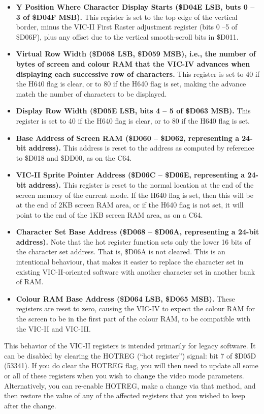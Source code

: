\begin{itemize}
\item {\bf Y Position Where Character Display Starts (\$D04E LSB, buts 0 -- 3 of \$D04F MSB).}  This register is set to the top edge of the vertical border, minus the VIC-II First Raster adjustment register (bits 0 --5 of \$D06F), plus any offset due to the vertical smooth-scroll bits in \$D011.
\item {\bf Virtual Row Width (\$D058 LSB, \$D059 MSB), i.e., the number of bytes of screen and colour RAM that the VIC-IV advances when displaying each successive row of characters.} This register is set to 40 if the H640 flag is clear, or to 80 if the H640 flag is set, making the advance match the number of characters to be displayed.
\item {\bf Display Row Width (\$D05E LSB, bits 4 -- 5 of \$D063 MSB).} This register is set to 40 if the H640 flag is clear, or to 80 if the H640 flag is set.
\item {\bf Base Address of Screen RAM (\$D060 -- \$D062, representing a 24-bit address).}  This address is reset to the address as computed by reference to \$D018 and \$DD00, as on the C64.
\item {\bf VIC-II Sprite Pointer Address (\$D06C -- \$D06E, representing a 24-bit address).} This register is reset to the normal location at the end of the screen memory of the current mode.  If the H640 flag is set, then this will be at the end of 2KB screen RAM area, or if the H640 flag is not set, it will point to the end of the 1KB screen RAM area, as on a C64.
\item {\bf Character Set Base Address (\$D068 -- \$D06A, representing a 24-bit address).}  Note that the hot register function sets only the lower 16 bits of the character set address. That is, \$D06A is not cleared. This is an intentional behaviour, that makes it easier to replace the character set in existing VIC-II-oriented software with another character set in another bank of RAM.
\item {\bf Colour RAM Base Address (\$D064 LSB, \$D065 MSB).} These registers are reset to zero, causing the VIC-IV to expect the colour RAM for the screen to be in the first part of the colour RAM, to be compatible with the VIC-II and VIC-III.
\end{itemize}

This behavior of the VIC-II registers is intended primarily for legacy software. It can be disabled by clearing the HOTREG (``hot register'') signal: bit 7 of \$D05D (53341).  If you do clear the HOTREG flag, you will then need to update all some or all of these registers when you wish to change the video mode parameters.  Alternatively, you can re-enable HOTREG, make a change via that method, and then restore the value of any of the affected registers that you wished to keep after the change.


